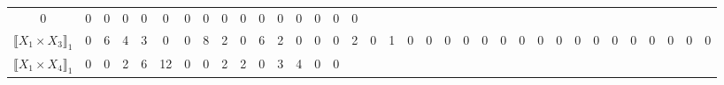 \documentclass[12pt]{article}
\theoremstyle{definition}
\theoremstyle{remark}
\begin{document}
{\begin{table}[H]
\begin{adjustbox}{angle=90}
{\begin{tabular}{c||c|c|c|c|c|c|c|c|c|c|c|c|c|c|c|c|c|c|c|c|c|c|c|c|c|c|c|c|c|c|c|c|c|c}
0  & %
0  & %
0  & %
0  & %
0  & %
0  & %
0  & %
0  & %
0  & %
0  & %
0  & %
0  & %
0  & %
0  & %
0  & %
0   %
\\
$\llbracket X_1 \times X_3 \rrbracket_1$ &
0  & %
6  & %
4  & %
3  & %
0  & %
0  & %
8  & %
2  & %
0  & %
6  & %
2  & %
0  & %
0  & %
0  & %
2  & %
0  & %
1  & %
0  & %
0  & %
0  & %
0  & %
0  & %
0  & %
0  & %
0  & %
0  & %
0  & %
0  & %
0  & %
0  & %
0  & %
0  & %
0  & %
0   %
\\
$\llbracket X_1 \times X_4 \rrbracket_1$ &
0  & %
0  & %
2  & %
6  & %
12  & %
0  & %
0  & %
2  & %
2  & %
0  & %
3  & %
4  & %
0  & %
0  & %

\end{tabular}}
\end{adjustbox}
\end{table}}
\end{document}
